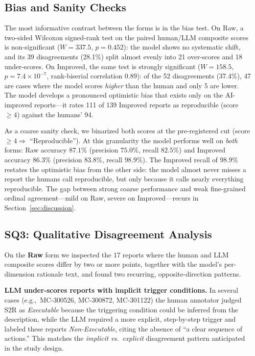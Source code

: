 \subsection{Bias and Sanity Checks}
\label{subsec:res-bias}

The most informative contrast between the forms is in the bias test. On Raw, a
two-sided Wilcoxon signed-rank test on the paired human/LLM composite scores is
non-significant ($W = 337.5$, $p = 0.452$): the model shows no systematic shift,
and its 39 disagreements (28.1\%) split almost evenly into 21 over-scores and
18 under-scores. On Improved, the same test is strongly significant
($W = 158.5$, $p = 7.4\times10^{-7}$, rank-biserial correlation $0.89$): of the
52 disagreements (37.4\%), 47 are cases where the model scores \emph{higher}
than the human and only 5 are lower. The model develops a pronounced optimistic
bias that exists only on the AI-improved reports---it rates 111 of 139 Improved
reports as reproducible (score $\geq 4$) against the humans' 94.

As a coarse sanity check, we binarized both scores at the pre-registered cut
(score $\geq 4 \Rightarrow$ ``Reproducible''). At this granularity the model
performs well on \emph{both} forms: Raw accuracy $87.1\%$ (precision $75.0\%$,
recall $82.5\%$) and Improved accuracy $86.3\%$ (precision $83.8\%$, recall
$98.9\%$). The Improved recall of $98.9\%$ restates the optimistic bias from the
other side: the model almost never misses a report the humans call
reproducible, but only because it calls nearly everything reproducible. The gap
between strong coarse performance and weak fine-grained ordinal agreement---mild
on Raw, severe on Improved---recurs in Section~\ref{sec:discussion}.

\subsection{SQ3: Qualitative Disagreement Analysis}
\label{subsec:res-sq3}

On the \textbf{Raw} form we inspected the 17 reports where the human and LLM
composite scores differ by two or more points, together with the model's
per-dimension rationale text, and found two recurring, opposite-direction
patterns.

\textbf{LLM under-scores reports with implicit trigger conditions.} In several
cases (e.g.,\ MC-300526, MC-300872, MC-301122) the human annotator judged S2R
as \emph{Executable} because the triggering condition could be inferred from the
description, while the LLM required a more explicit, step-by-step trigger and
labeled these reports \emph{Non-Executable}, citing the absence of ``a clear
sequence of actions.'' This matches the \emph{implicit vs.\ explicit}
disagreement pattern anticipated in the study design.

